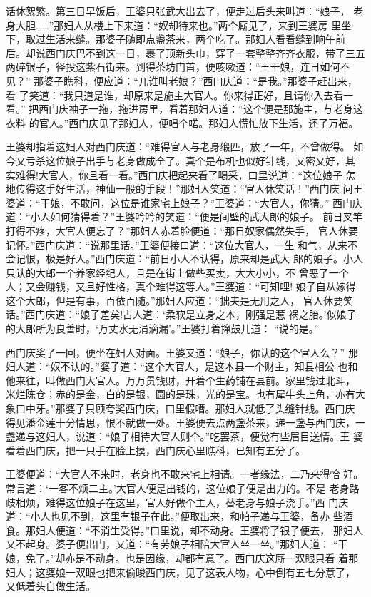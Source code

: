 话休絮繁。第三日早饭后，王婆只张武大出去了，便走过后头来叫道：“娘子，
老身大胆……”那妇人从楼上下来道：“奴却待来也。”两个厮见了，来到王婆房
里坐下，取过生活来缝。那婆子随即点盏茶来，两个吃了。那妇人看看缝到晌午前
后。却说西门庆巴不到这一日，裹了顶新头巾，穿了一套整整齐齐衣服，带了三五
两碎银子，径投这紫石街来。到得茶坊门首，便咳嗽道：“王干娘，连日如何不见？”
那婆子瞧科，便应道：“兀谁叫老娘？”西门庆道：“是我。”那婆子赶出来，看
了笑道：“我只道是谁，却原来是施主大官人。你来得正好，且请你入去看一看。”
把西门庆袖子一拖，拖进房里，看着那妇人道：“这个便是那施主，与老身这衣料
的官人。”西门庆见了那妇人，便唱个喏。那妇人慌忙放下生活，还了万福。

王婆却指着这妇人对西门庆道：“难得官人与老身缎匹，放了一年，不曾做得。
如今又亏杀这位娘子出手与老身做成全了。真个是布机也似好针线，又密又好，其
实难得!大官人，你且看一看。”西门庆把起来看了喝采，口里说道：“这位娘子
怎地传得这手好生活，神仙一般的手段！”那妇人笑道：“官人休笑话！”西门庆
问王婆道：“干娘，不敢问，这位是谁家宅上娘子？”王婆道：“大官人，你猜。”
西门庆道：“小人如何猜得着？”王婆吟吟的笑道：“便是间壁的武大郎的娘子。
前日叉竿打得不疼，大官人便忘了？”那妇人赤着脸便道：“那日奴家偶然失手，
官人休要记怀。”西门庆道：“说那里话。”王婆便接口道：“这位大官人，一生
和气，从来不会记恨，极是好人。”西门庆道：“前日小人不认得，原来却是武大
郎的娘子。小人只认的大郎一个养家经纪人，且是在街上做些买卖，大大小小，不
曾恶了一个人；又会赚钱，又且好性格，真个难得这等人。”王婆道：“可知哩!
娘子自从嫁得这个大郎，但是有事，百依百随。”那妇人应道：“拙夫是无用之人，
官人休要笑话。”西门庆道：“娘子差矣!古人道：‘柔软是立身之本，刚强是惹
祸之胎。’似娘子的大郎所为良善时，‘万丈水无涓滴漏’。”王婆打着撺鼓儿道：
“说的是。”

西门庆奖了一回，便坐在妇人对面。王婆又道：“娘子，你认的这个官人么？”
那妇人道：“奴不认的。”婆子道：“这个大官人，是这本县一个财主，知县相公
也和他来往，叫做西门大官人。万万贯钱财，开着个生药铺在县前。家里钱过北斗，
米烂陈仓；赤的是金，白的是银，圆的是珠，光的是宝。也有犀牛头上角，亦有大
象口中牙。”那婆子只顾夸奖西门庆，口里假嘈。那妇人就低了头缝针线。西门庆
得见潘金莲十分情思，恨不就做一处。王婆便去点两盏茶来，递一盏与西门庆，一
盏递与这妇人，说道：“娘子相待大官人则个。”吃罢茶，便觉有些眉目送情。王
婆看着西门庆，把一只手在脸上摸，西门庆心里瞧科，已知有五分了。

王婆便道：“大官人不来时，老身也不敢来宅上相请。一者缘法，二乃来得恰
好。常言道：‘一客不烦二主。’大官人便是出钱的，这位娘子便是出力的。不是
老身路歧相烦，难得这位娘子在这里，官人好做个主人，替老身与娘子浇手。”西
门庆道：“小人也见不到，这里有银子在此。”便取出来，和帕子递与王婆，备办
些酒食。那妇人便道：“不消生受得。”口里说，却不动身。王婆将了银子便去，
那妇人又不起身。婆子便出门，又道：“有劳娘子相陪大官人坐一坐。”那妇人道：
“干娘，免了。”却亦是不动身。也是因缘，却都有意了。西门庆这厮一双眼只看
着那妇人；这婆娘一双眼也把来偷睃西门庆，见了这表人物，心中倒有五七分意了，
又低着头自做生活。

